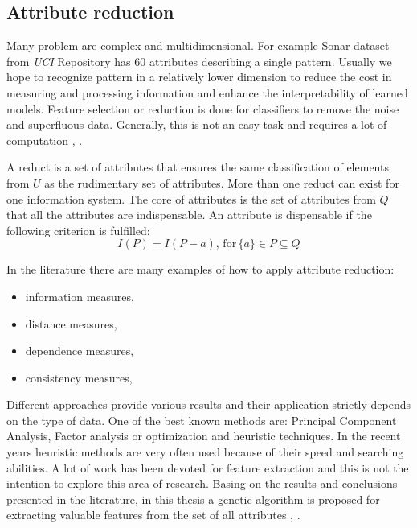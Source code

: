 \subsection{Attribute reduction}
\label{cha:Attribute_reduction}
Many problem are complex and multidimensional. For example Sonar dataset from
\textit{UCI} Repository has 60 attributes describing a single pattern. 
Usually we hope to recognize pattern in a relatively
lower dimension to reduce the cost in measuring and processing information and
enhance the interpretability of learned models. Feature selection or reduction 
is done for classifiers to remove the noise and superfluous data. Generally,
this is not an easy task and requires a lot of computation \cite{bib1}, \cite{bib5}.  

A reduct is a set of attributes that ensures the same classification of
elements from $U$ as the rudimentary set of attributes. More than one reduct
can exist for one information system. The core of attributes is the set of
attributes from $Q$ that all the attributes are indispensable. An attribute is
dispensable if the following criterion is fulfilled:
$$I(P) = I(P-{a}), \, \textrm{for} \, \{a\} \in P \subseteq  Q $$

In the literature there are many examples of how to apply attribute reduction:
\begin{itemize}
    \item information measures,
    \item distance measures,
    \item dependence measures,
    \item consistency measures,
\end{itemize}
Different approaches provide various results and their application strictly
depends on the type of data. One of the best known methods are: Principal
Component Analysis, Factor analysis or optimization and heuristic techniques.
In the recent years heuristic methods are very often used because of their
speed and searching abilities. A lot of work has been devoted for feature
extraction and this is not the intention to explore this area of research.
Basing on the results and conclusions presented in the literature, in this thesis a 
genetic algorithm is proposed for extracting valuable features from the set of 
all attributes \cite{bib27}, \cite{bib48}.

